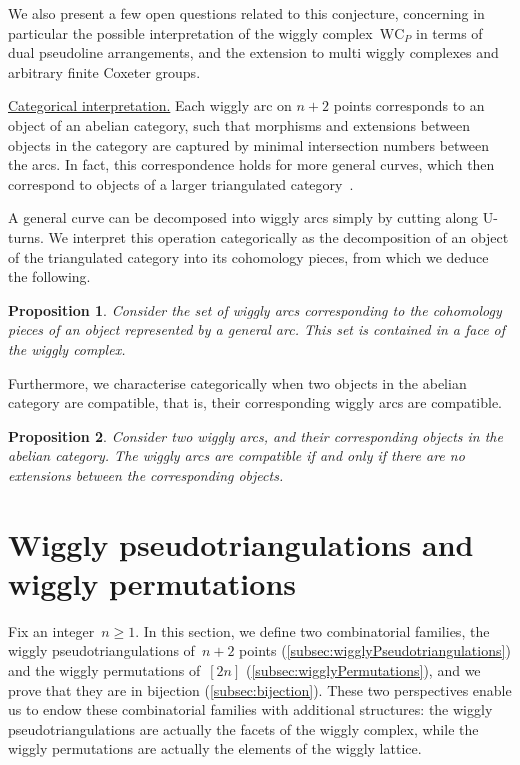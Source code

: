 \documentclass{amsart}
\newtheorem*{proposition*}{Proposition}%
\theoremstyle{definition}
\newcommand{\para}[1]{\smallskip\noindent\uline{#1.}} %
\newcommand{\wigglyComplex}{\mathrm{WC}} %
\begin{document}
We also present a few open questions related to this conjecture, concerning in particular the possible interpretation of the wiggly complex~$\wigglyComplex_P$ in terms of dual pseudoline arrangements, and the extension to multi wiggly complexes and arbitrary finite Coxeter groups.

\pagebreak
\para{Categorical interpretation}
Each wiggly arc on \(n+2\) points corresponds to an object of an abelian category, such that morphisms and extensions between objects in the category are captured by minimal intersection numbers between the arcs.
In fact, this correspondence holds for more general curves, which then correspond to objects of a larger triangulated category~\cite{kho.sei:02}.

A general curve can be decomposed into wiggly arcs simply by cutting along U-turns.
We interpret this operation categorically as the decomposition of an object of the triangulated category into its cohomology pieces, from which we deduce the following.
\begin{proposition*}
  Consider the set of wiggly arcs corresponding to the cohomology pieces of an object represented by a general arc.
  This set is contained in a face of the wiggly complex.
\end{proposition*}
Furthermore, we characterise categorically when two objects in the abelian category are compatible, that is, their corresponding wiggly arcs are compatible.
\begin{proposition*}
  Consider two wiggly arcs, and their corresponding objects in the abelian category.
  The wiggly arcs are compatible if and only if there are no extensions between the corresponding objects.
\end{proposition*}


\section{Wiggly pseudotriangulations and wiggly permutations}
\label{sec:combinatorics}

Fix an integer~$n \ge 1$.
In this section, we define two combinatorial families, the wiggly pseudotriangulations of~$n+2$ points (\cref{subsec:wigglyPseudotriangulations}) and the wiggly permutations of~$[2n]$ (\cref{subsec:wigglyPermutations}), and we prove that they are in bijection (\cref{subsec:bijection}).
These two perspectives enable us to endow these combinatorial families with additional structures: the wiggly pseudotriangulations are actually the facets of the wiggly complex, while the wiggly permutations are actually the elements of the wiggly lattice.
\end{document}
